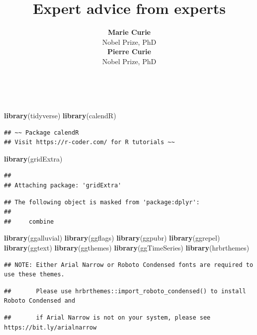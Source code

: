 \documentclass[11pt,a4paper,]{article}
\title{Expert advice from experts}
\author{\sf\Large\textbf{ Marie Curie}\\ {\sf\large Nobel Prize, PhD\\[0.5cm]} \sf\Large\textbf{ Pierre Curie}\\ {\sf\large Nobel Prize, PhD\\[0.5cm]}}
\date{\sf\Date~\Month~\Year}
\makeatletter
\newenvironment{Shaded}{\begin{snugshade}}{\end{snugshade}}
\newcommand{\KeywordTok}[1]{\textcolor[rgb]{0.13,0.29,0.53}{\textbf{#1}}}
\newcommand{\NormalTok}[1]{#1}
\def\titlepage{\front{\expandafter{\@title}}{\@author}{\@organization}}
\makeatother
\begin{document}
\titlepage

\begin{Shaded}
\begin{Highlighting}[]
\KeywordTok{library}\NormalTok{(tidyverse)}
\KeywordTok{library}\NormalTok{(calendR)}
\end{Highlighting}
\end{Shaded}

\begin{verbatim}
## ~~ Package calendR
## Visit https://r-coder.com/ for R tutorials ~~
\end{verbatim}

\begin{Shaded}
\begin{Highlighting}[]
\KeywordTok{library}\NormalTok{(gridExtra)}
\end{Highlighting}
\end{Shaded}

\begin{verbatim}
## 
## Attaching package: 'gridExtra'
\end{verbatim}

\begin{verbatim}
## The following object is masked from 'package:dplyr':
## 
##     combine
\end{verbatim}

\begin{Shaded}
\begin{Highlighting}[]
\KeywordTok{library}\NormalTok{(ggalluvial)}
\KeywordTok{library}\NormalTok{(ggflags)}
\KeywordTok{library}\NormalTok{(ggpubr)}
\KeywordTok{library}\NormalTok{(ggrepel)}
\KeywordTok{library}\NormalTok{(ggtext)}
\KeywordTok{library}\NormalTok{(ggthemes)}
\KeywordTok{library}\NormalTok{(ggTimeSeries)}
\KeywordTok{library}\NormalTok{(hrbrthemes)}
\end{Highlighting}
\end{Shaded}

\begin{verbatim}
## NOTE: Either Arial Narrow or Roboto Condensed fonts are required to use these themes.
\end{verbatim}

\begin{verbatim}
##       Please use hrbrthemes::import_roboto_condensed() to install Roboto Condensed and
\end{verbatim}

\begin{verbatim}
##       if Arial Narrow is not on your system, please see https://bit.ly/arialnarrow
\end{verbatim}
\end{document}
